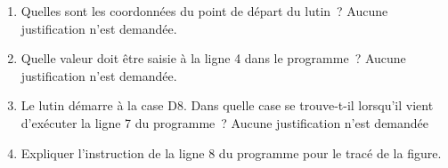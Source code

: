 \documentclass[exercice,a4]{thedocument}%
\begin{document}
    \begin{enumerate}
        \item Quelles sont les coordonnées du point de départ du lutin~?
            Aucune justification n'est demandée.
        \item Quelle valeur doit être saisie à la ligne 4 dans le
            programme~? Aucune justification n'est demandée.
        \item Le lutin démarre à la case D8. Dans quelle case se trouve-t-il
            lorsqu'il vient d'exécuter la ligne 7 du programme~?
            Aucune justification n'est demandée
            \begin{center}
            \end{center}
        \item Expliquer l'instruction  de la ligne 8 du
            programme pour le tracé de la figure.
    \end{enumerate}
\end{document}
